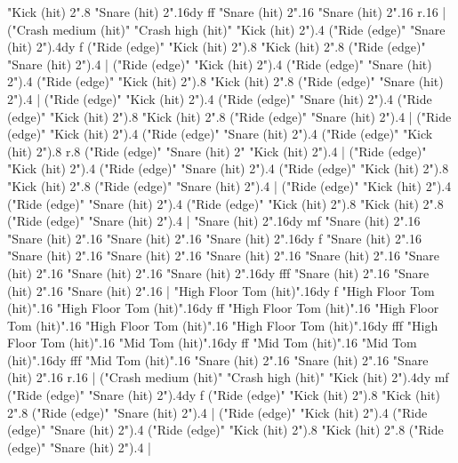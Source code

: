       "Kick (hit) 2".8
      "Snare (hit) 2".16{dy ff}
      "Snare (hit) 2".16
      "Snare (hit) 2".16
      r.16
    |
      ("Crash medium (hit)" "Crash high (hit)" "Kick (hit) 2").4
      ("Ride (edge)" "Snare (hit) 2").4{dy f}
      ("Ride (edge)" "Kick (hit) 2").8
      "Kick (hit) 2".8
      ("Ride (edge)" "Snare (hit) 2").4
    |
      ("Ride (edge)" "Kick (hit) 2").4
      ("Ride (edge)" "Snare (hit) 2").4
      ("Ride (edge)" "Kick (hit) 2").8
      "Kick (hit) 2".8
      ("Ride (edge)" "Snare (hit) 2").4
    |
      ("Ride (edge)" "Kick (hit) 2").4
      ("Ride (edge)" "Snare (hit) 2").4
      ("Ride (edge)" "Kick (hit) 2").8
      "Kick (hit) 2".8
      ("Ride (edge)" "Snare (hit) 2").4
    |
      ("Ride (edge)" "Kick (hit) 2").4
      ("Ride (edge)" "Snare (hit) 2").4
      ("Ride (edge)" "Kick (hit) 2").8
      r.8
      ("Ride (edge)" "Snare (hit) 2" "Kick (hit) 2").4
    |
      ("Ride (edge)" "Kick (hit) 2").4
      ("Ride (edge)" "Snare (hit) 2").4
      ("Ride (edge)" "Kick (hit) 2").8
      "Kick (hit) 2".8
      ("Ride (edge)" "Snare (hit) 2").4
    |
      ("Ride (edge)" "Kick (hit) 2").4
      ("Ride (edge)" "Snare (hit) 2").4
      ("Ride (edge)" "Kick (hit) 2").8
      "Kick (hit) 2".8
      ("Ride (edge)" "Snare (hit) 2").4
    |
      "Snare (hit) 2".16{dy mf}
      "Snare (hit) 2".16
      "Snare (hit) 2".16
      "Snare (hit) 2".16
      "Snare (hit) 2".16{dy f}
      "Snare (hit) 2".16
      "Snare (hit) 2".16
      "Snare (hit) 2".16
      "Snare (hit) 2".16
      "Snare (hit) 2".16
      "Snare (hit) 2".16
      "Snare (hit) 2".16
      "Snare (hit) 2".16{dy fff}
      "Snare (hit) 2".16
      "Snare (hit) 2".16
      "Snare (hit) 2".16
    |
      "High Floor Tom (hit)".16{dy f}
      "High Floor Tom (hit)".16
      "High Floor Tom (hit)".16{dy ff}
      "High Floor Tom (hit)".16
      "High Floor Tom (hit)".16
      "High Floor Tom (hit)".16
      "High Floor Tom (hit)".16{dy fff}
      "High Floor Tom (hit)".16
      "Mid Tom (hit)".16{dy ff}
      "Mid Tom (hit)".16
      "Mid Tom (hit)".16{dy fff}
      "Mid Tom (hit)".16
      "Snare (hit) 2".16
      "Snare (hit) 2".16
      "Snare (hit) 2".16
      r.16
    |
      ("Crash medium (hit)" "Crash high (hit)" "Kick (hit) 2").4{dy mf}
      ("Ride (edge)" "Snare (hit) 2").4{dy f}
      ("Ride (edge)" "Kick (hit) 2").8
      "Kick (hit) 2".8
      ("Ride (edge)" "Snare (hit) 2").4
    |
      ("Ride (edge)" "Kick (hit) 2").4
      ("Ride (edge)" "Snare (hit) 2").4
      ("Ride (edge)" "Kick (hit) 2").8
      "Kick (hit) 2".8
      ("Ride (edge)" "Snare (hit) 2").4
    |
